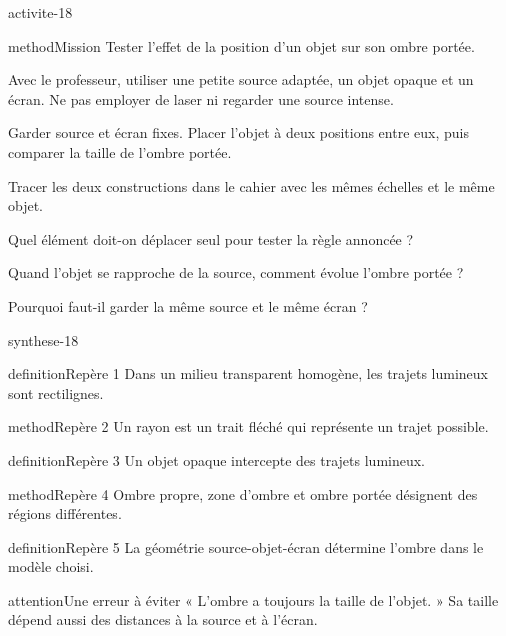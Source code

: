 \documentclass[12pt,twoside,openany]{book}
\begin{document}
\label{ch-18-activite}
\begin{pcFiche}{activite-18}
\begin{pcEncadre}{method}{Mission}
Tester l’effet de la position d’un objet sur son ombre portée.\par
\end{pcEncadre}
\begin{questions}
\item Avec le professeur, utiliser une petite source adaptée, un objet opaque et un écran. Ne pas employer de laser ni regarder une source intense.
\item Garder source et écran fixes. Placer l’objet à deux positions entre eux, puis comparer la taille de l’ombre portée.
\item Tracer les deux constructions dans le cahier avec les mêmes échelles et le même objet.
\end{questions}
\begin{questions}
\item Quel élément doit-on déplacer seul pour tester la règle annoncée ?
\item Quand l’objet se rapproche de la source, comment évolue l’ombre portée ?
\item Pourquoi faut-il garder la même source et le même écran ?
\end{questions}
\end{pcFiche}
\label{ch-18-bilan}
\begin{pcFiche}{synthese-18}
\begin{pcEncadre}{definition}{Repère 1}
Dans un milieu transparent homogène, les trajets lumineux sont rectilignes.\par
\end{pcEncadre}
\begin{pcEncadre}{method}{Repère 2}
Un rayon est un trait fléché qui représente un trajet possible.\par
\end{pcEncadre}
\begin{pcEncadre}{definition}{Repère 3}
Un objet opaque intercepte des trajets lumineux.\par
\end{pcEncadre}
\begin{pcEncadre}{method}{Repère 4}
Ombre propre, zone d’ombre et ombre portée désignent des régions différentes.\par
\end{pcEncadre}
\begin{pcEncadre}{definition}{Repère 5}
La géométrie source-objet-écran détermine l’ombre dans le modèle choisi.\par
\end{pcEncadre}
\begin{pcEncadre}{attention}{Une erreur à éviter}
« L’ombre a toujours la taille de l’objet. » Sa taille dépend aussi des distances à la source et à l’écran.\par
\end{pcEncadre}
\end{pcFiche}
\end{document}

